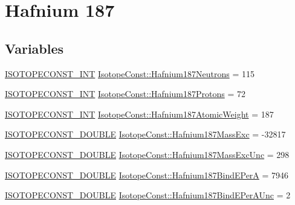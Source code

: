 \hypertarget{group___isotope_const-_hafnium-_hf187}{}\section{Hafnium 187}
\label{group___isotope_const-_hafnium-_hf187}
\subsection*{Variables}
\begin{DoxyCompactItemize}
\item 
\mbox{\hyperlink{group___isotope_const-_macros_ga5f18360b3e99483a35c32d789e62621c}{I\+S\+O\+T\+O\+P\+E\+C\+O\+N\+S\+T\+\_\+\+I\+NT}} \mbox{\hyperlink{group___isotope_const-_hafnium-_hf187_gab419e2edd3f2644bbd11cb934a03c382}{Isotope\+Const\+::\+Hafnium187\+Neutrons}} = 115
\item 
\mbox{\hyperlink{group___isotope_const-_macros_ga5f18360b3e99483a35c32d789e62621c}{I\+S\+O\+T\+O\+P\+E\+C\+O\+N\+S\+T\+\_\+\+I\+NT}} \mbox{\hyperlink{group___isotope_const-_hafnium-_hf187_ga95faa33f56f7c4ccec179c1dfd275da8}{Isotope\+Const\+::\+Hafnium187\+Protons}} = 72
\item 
\mbox{\hyperlink{group___isotope_const-_macros_ga5f18360b3e99483a35c32d789e62621c}{I\+S\+O\+T\+O\+P\+E\+C\+O\+N\+S\+T\+\_\+\+I\+NT}} \mbox{\hyperlink{group___isotope_const-_hafnium-_hf187_gac3bade304cafa30e03ec25badee133be}{Isotope\+Const\+::\+Hafnium187\+Atomic\+Weight}} = 187
\item 
\mbox{\hyperlink{group___isotope_const-_macros_ga8f45a7272ce02c0b4c65c44636ed719a}{I\+S\+O\+T\+O\+P\+E\+C\+O\+N\+S\+T\+\_\+\+D\+O\+U\+B\+LE}} \mbox{\hyperlink{group___isotope_const-_hafnium-_hf187_gafe3f9020fa4b933f74f8bf9a5c081e88}{Isotope\+Const\+::\+Hafnium187\+Mass\+Exc}} = -\/32817
\item 
\mbox{\hyperlink{group___isotope_const-_macros_ga8f45a7272ce02c0b4c65c44636ed719a}{I\+S\+O\+T\+O\+P\+E\+C\+O\+N\+S\+T\+\_\+\+D\+O\+U\+B\+LE}} \mbox{\hyperlink{group___isotope_const-_hafnium-_hf187_ga0c604d3a05aa748a30dffc42ee780b93}{Isotope\+Const\+::\+Hafnium187\+Mass\+Exc\+Unc}} = 298
\item 
\mbox{\hyperlink{group___isotope_const-_macros_ga8f45a7272ce02c0b4c65c44636ed719a}{I\+S\+O\+T\+O\+P\+E\+C\+O\+N\+S\+T\+\_\+\+D\+O\+U\+B\+LE}} \mbox{\hyperlink{group___isotope_const-_hafnium-_hf187_gab258f6ce562710dbd7dc418d283a3086}{Isotope\+Const\+::\+Hafnium187\+Bind\+E\+PerA}} = 7946
\item 
\mbox{\hyperlink{group___isotope_const-_macros_ga8f45a7272ce02c0b4c65c44636ed719a}{I\+S\+O\+T\+O\+P\+E\+C\+O\+N\+S\+T\+\_\+\+D\+O\+U\+B\+LE}} \mbox{\hyperlink{group___isotope_const-_hafnium-_hf187_gabcf48213a7e1c36fca806b9692485c3f}{Isotope\+Const\+::\+Hafnium187\+Bind\+E\+Per\+A\+Unc}} = 2

\end{DoxyCompactItemize}
